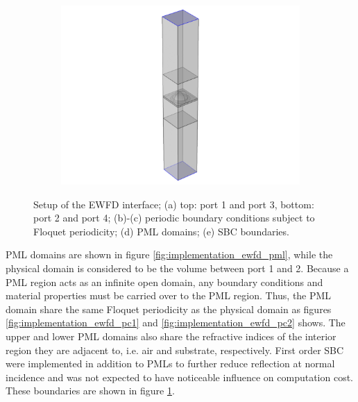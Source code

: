 \begin{figure}[htb]
\begin{subfigure}{0.19\textwidth}
        \includegraphics[width=\linewidth, trim=4.2cm 0 4.2cm 0cm, clip]{figures/ch4/implem/ewfd/ewfd_sbc.png}
        \caption{}
        \label{fig:implementation_ewfd_sbc}
    \end{subfigure}
    \caption{Setup of the EWFD interface; (a) top: port 1 and port 3, bottom: port 2 and port 4; (b)-(c) periodic boundary conditions subject to Floquet periodicity; (d) PML domains; (e) SBC boundaries.}
    \label{fig:implementation_ewfd_setup}
\end{figure}

PML domains are shown in figure \ref{fig:implementation_ewfd_pml}, while the physical domain is considered to be the volume between port 1 and 2. Because a PML region acts as an infinite open domain, any boundary conditions and material properties must be carried over to the PML region. Thus, the PML domain share the same Floquet periodicity as the physical domain as figures \ref{fig:implementation_ewfd_pc1} and \ref{fig:implementation_ewfd_pc2} shows. The upper and lower PML domains also share the refractive indices of the interior region they are adjacent to, i.e. air and substrate, respectively. First order SBC were implemented in addition to PMLs to further reduce reflection at normal incidence and was not expected to have noticeable influence on computation cost. These boundaries are shown in figure \ref{fig:implementation_ewfd_sbc}.

